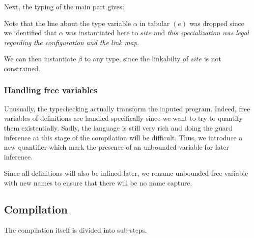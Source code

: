 \documentclass[10pt,a4paper]{article}
\begin{document}
Next, the typing of the main part gives:
\begin{figure}[H]
  \centering
  \quad\quad
  \quad\quad
\end{figure}

Note that the line about the type variable $\alpha$ in tabular $(e)$ was dropped since we identified that $\alpha$ was instantiated here to $site$ and \emph{this specialization was legal regarding the configuration and the link map}.

We can then instantiate $\beta$ to any type, since the linkabilty of $site$ is not constrained.

\subsubsection{Handling free variables}
Unusually, the typechecking actually transform the inputed program. Indeed, free variables of definitions are handled specifically since we want to try to quantify them existentially. Sadly, the language is still very rich and doing the guard inference at this stage of the compilation will be difficult. Thus, we introduce a new quantifier which mark the presence of an unbounded variable for later inference.

Since all definitions will also be inlined later, we rename unbounded free variable with new names to ensure that there will be no name capture.

\subsection{Compilation}
The compilation itself is divided into sub-steps.
\end{document}
